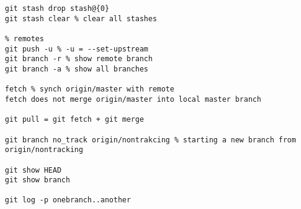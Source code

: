 \documentclass[12pt,letterpaper]{article}
\begin{document}
\begin{lstlisting}
git stash drop stash@{0} 
git stash clear % clear all stashes

% remotes 
git push -u % -u = --set-upstream
git branch -r % show remote branch
git branch -a % show all branches

fetch % synch origin/master with remote 
fetch does not merge origin/master into local master branch

git pull = git fetch + git merge 

git branch no_track origin/nontrakcing % starting a new branch from origin/nontracking 

git show HEAD
git show branch 

git log -p onebranch..another




\end{lstlisting}
\end{document}
